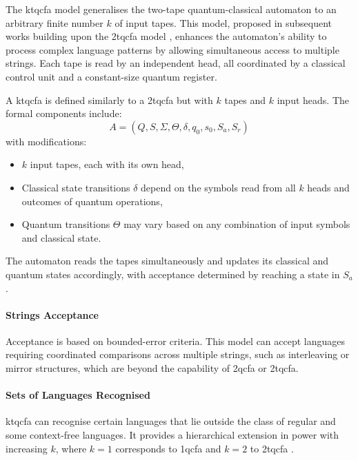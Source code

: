   
The \gls{ktqcfa} model generalises the two-tape quantum-classical automaton to an arbitrary finite number $k$ of input tapes. This model, proposed in subsequent works building upon the \gls{2tqcfa} model \cite{zheng2011two}, enhances the automaton's ability to process complex language patterns by allowing simultaneous access to multiple strings. Each tape is read by an independent head, all coordinated by a classical control unit and a constant-size quantum register.

\begin{definition}
A \gls{ktqcfa} is defined similarly to a \gls{2tqcfa} but with $k$ tapes and $k$ input heads. The formal components include:
\[
A = (Q, S, \Sigma, \Theta, \delta, q_0, s_0, S_a, S_r)
\]
with modifications:
\begin{itemize}
    \item $k$ input tapes, each with its own head,
    \item Classical state transitions $\delta$ depend on the symbols read from all $k$ heads and outcomes of quantum operations,
    \item Quantum transitions $\Theta$ may vary based on any combination of input symbols and classical state.
\end{itemize}
\end{definition}

The automaton reads the tapes simultaneously and updates its classical and quantum states accordingly, with acceptance determined by reaching a state in $S_a$.

\paragraph{Strings Acceptance}  
Acceptance is based on bounded-error criteria. This model can accept languages requiring coordinated comparisons across multiple strings, such as interleaving or mirror structures, which are beyond the capability of \gls{2qcfa} or \gls{2tqcfa}.

\paragraph{Sets of Languages Recognised}  
\gls{ktqcfa} can recognise certain languages that lie outside the class of regular and some context-free languages. It provides a hierarchical extension in power with increasing $k$, where $k=1$ corresponds to \gls{1qcfa} and $k=2$ to \gls{2tqcfa} \cite{li2015hybrid}.

